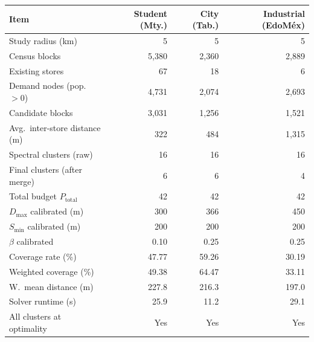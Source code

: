 \begin{tabular}{lrrr}
\toprule
\textbf{Item}
  & \textbf{Student (Mty.)}
  & \textbf{City (Tab.)}
  & \textbf{Industrial (EdoMéx)} \\
\midrule
Study radius (km)             & 5    & 5    & 5 \\
Census blocks                  & 5{,}380 & 2{,}360 & 2{,}889 \\
Existing stores                & 67   & 18   & 6 \\
Demand nodes (pop.\ $>0$)     & 4{,}731 & 2{,}074 & 2{,}693 \\
Candidate blocks               & 3{,}031 & 1{,}256 & 1{,}521 \\
Avg.\ inter-store distance (m) & 322  & 484  & 1{,}315 \\
Spectral clusters (raw)        & 16   & 16   & 16 \\
Final clusters (after merge)   & 6    & 6    & 4 \\
Total budget $P_{\text{total}}$& 42   & 42   & 42 \\
$D_{\max}$ calibrated (m)     & 300  & 366  & 450 \\
$S_{\min}$ calibrated (m)     & 200  & 200  & 200 \\
$\beta$ calibrated             & 0.10 & 0.25 & 0.25 \\
\midrule
Coverage rate (\%)             & 47.77 & 59.26 & 30.19 \\
Weighted coverage (\%)         & 49.38 & 64.47 & 33.11 \\
W.\ mean distance (m)         & 227.8 & 216.3 & 197.0 \\
Solver runtime (s)             & 25.9  & 11.2  & 29.1 \\
All clusters at optimality     & Yes  & Yes  & Yes \\
\bottomrule
\end{tabular}
